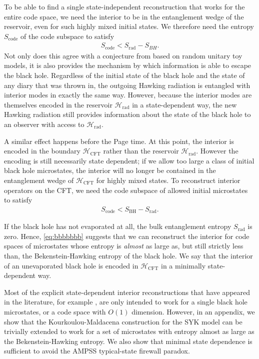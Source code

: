 \documentclass[12pt]{article}
\newcommand{\Srad}{S_\text{rad} }
\begin{document}
To be able to find a single state-independent reconstruction that works for the entire code space, we need the interior to be in the entanglement wedge of the reservoir, even for such highly mixed initial states. We therefore need the entropy $S_\text{code}$ of the code subspace to satisfy
\begin{align}
S_\text{code} < \Srad - S_{BH}.
\end{align}
Not only does this agree with a conjecture from \cite{hayden2018learning} based on random unitary toy models, it is also provides the mechanism by which information is able to escape the black hole. Regardless of the initial state of the black hole and the state of any diary that was thrown in, the outgoing Hawking radiation is entangled with interior modes in exactly the same way. However, because the interior modes are themselves encoded in the reservoir $\mathcal{H}_\text{rad}$ in a state-dependent way, the new Hawking radiation still provides information about the state of the black hole to an observer with access to $\mathcal{H}_\text{rad}$.

A similar effect happens before the Page time. At this point, the interior is encoded in the boundary $\mathcal{H}_\text{CFT}$ rather than the reservoir $\mathcal{H}_\text{rad}$. However the encoding is still necessarily state dependent; if we allow too large a class of initial black hole microstates, the interior will no longer be contained in the entanglement wedge of $\mathcal{H}_\text{CFT}$ for highly mixed states. To reconstruct interior operators on the CFT, we need the code subspace of allowed initial microstates to satisfy
\begin{align} \label{eq:bbbbbbb}
S_\text{code} < S_\text{BH} - \Srad.
\end{align}

If the black hole has not evaporated at all, the bulk entanglement entropy $\Srad$ is zero. Hence, \eqref{eq:bbbbbbb} suggests that we can reconstruct the interior for code spaces of microstates whose entropy is \emph{almost} as large as, but still strictly less than, the Bekenstein-Hawking entropy of the black hole. We say that the interior of an unevaporated black hole is encoded in $\mathcal{H}_\text{CFT}$ in a minimally state-dependent way.

Most of the explicit state-dependent interior reconstructions that have appeared in the literature, for example \cite{papadodimas2013infalling, papadodimas2014state, kourkoulou2017pure, de2018interior}, are only intended to work for a single black hole microstates, or a code space with $O(1)$ dimension. However, in an appendix, we show that the Kourkoulou-Maldacena construction for the SYK model \cite{kourkoulou2017pure} can be trivially extended to work for  a set of microstates with entropy almost as large as the Bekenstein-Hawking entropy. We also show that minimal state dependence is sufficient to avoid the AMPSS typical-state firewall paradox.
\end{document}
